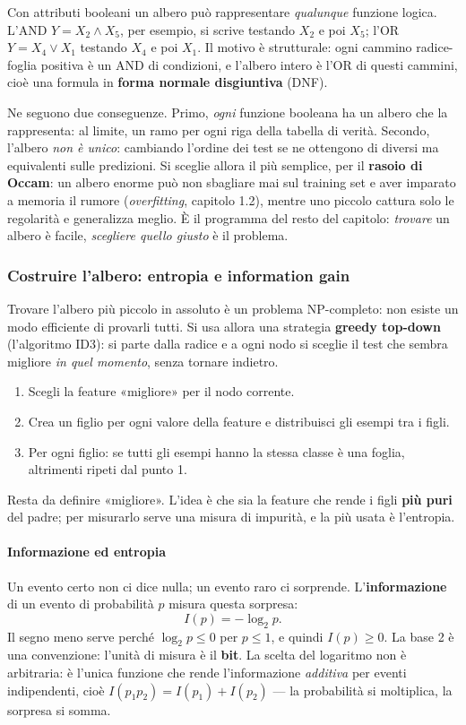 \documentclass[12pt]{extarticle}
\begin{document}
\noindent Con attributi booleani un albero può rappresentare \emph{qualunque} funzione logica. L'AND $Y=X_2 \land X_5$, per esempio, si scrive testando $X_2$ e poi $X_5$; l'OR $Y=X_4 \lor X_1$ testando $X_4$ e poi $X_1$. Il motivo è strutturale: ogni cammino radice-foglia positiva è un AND di condizioni, e l'albero intero è l'OR di questi cammini, cioè una formula in \textbf{forma normale disgiuntiva} (DNF).

\noindent Ne seguono due conseguenze. Primo, \emph{ogni} funzione booleana ha un albero che la rappresenta: al limite, un ramo per ogni riga della tabella di verità. Secondo, l'albero \emph{non è unico}: cambiando l'ordine dei test se ne ottengono di diversi ma equivalenti sulle predizioni. Si sceglie allora il più semplice, per il \textbf{rasoio di Occam}: un albero enorme può non sbagliare mai sul training set e aver imparato a memoria il rumore (\textit{overfitting}, capitolo 1.2), mentre uno piccolo cattura solo le regolarità e generalizza meglio. È il programma del resto del capitolo: \emph{trovare} un albero è facile, \emph{scegliere quello giusto} è il problema.

\subsubsection{Costruire l'albero: entropia e information gain}

\noindent Trovare l'albero più piccolo in assoluto è un problema NP-completo: non esiste un modo efficiente di provarli tutti. Si usa allora una strategia \textbf{greedy top-down} (l'algoritmo ID3): si parte dalla radice e a ogni nodo si sceglie il test che sembra migliore \emph{in quel momento}, senza tornare indietro.
\begin{enumerate}
    \item Scegli la feature «migliore» per il nodo corrente.
    \item Crea un figlio per ogni valore della feature e distribuisci gli esempi tra i figli.
    \item Per ogni figlio: se tutti gli esempi hanno la stessa classe è una foglia, altrimenti ripeti dal punto 1.
\end{enumerate}
Resta da definire «migliore». L'idea è che sia la feature che rende i figli \textbf{più puri} del padre; per misurarlo serve una misura di impurità, e la più usata è l'entropia.

\paragraph{Informazione ed entropia}
Un evento certo non ci dice nulla; un evento raro ci sorprende. L'\textbf{informazione} di un evento di probabilità $p$ misura questa sorpresa:
\[
I(p) = -\log_2 p .
\]
Il segno meno serve perché $\log_2 p \le 0$ per $p\le 1$, e quindi $I(p)\ge 0$. La base 2 è una convenzione: l'unità di misura è il \textbf{bit}. La scelta del logaritmo non è arbitraria: è l'unica funzione che rende l'informazione \emph{additiva} per eventi indipendenti, cioè $I(p_1 p_2) = I(p_1) + I(p_2)$ — la probabilità si moltiplica, la sorpresa si somma.
\end{document}
